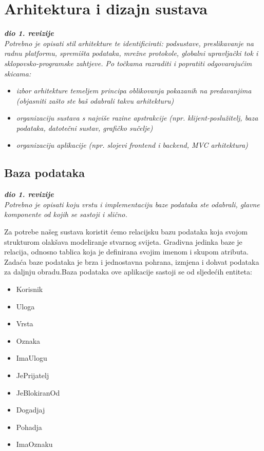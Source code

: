 \chapter{Arhitektura i dizajn sustava}
		
		\textbf{\textit{dio 1. revizije}}\\

		\textit{ Potrebno je opisati stil arhitekture te identificirati: podsustave, preslikavanje na radnu platformu, spremišta podataka, mrežne protokole, globalni upravljački tok i sklopovsko-programske zahtjeve. Po točkama razraditi i popratiti odgovarajućim skicama:}
	\begin{itemize}
		\item 	\textit{izbor arhitekture temeljem principa oblikovanja pokazanih na predavanjima (objasniti zašto ste baš odabrali takvu arhitekturu)}
		\item 	\textit{organizaciju sustava s najviše razine apstrakcije (npr. klijent-poslužitelj, baza podataka, datotečni sustav, grafičko sučelje)}
		\item 	\textit{organizaciju aplikacije (npr. slojevi frontend i backend, MVC arhitektura) }		
	\end{itemize}

	
		

		

				
		\section{Baza podataka}
			
			\textbf{\textit{dio 1. revizije}}\\
			
		\textit{Potrebno je opisati koju vrstu i implementaciju baze podataka ste odabrali, glavne komponente od kojih se sastoji i slično.}
		
		Za potrebe našeg sustava koristit ćemo relacijsku bazu podataka koja svojom strukturom olakšava modeliranje stvarnog svijeta. Gradivna jedinka baze je relacija, odnosno tablica koja je definirana svojim imenom i skupom atributa. Zadaća baze podataka je brza i jednostavna pohrana, izmjena i dohvat podataka za daljnju obradu.Baza podataka ove aplikacije sastoji se od sljedećih entiteta:
		
		\begin{itemize}
			\item Korisnik
			\item Uloga
			\item Vrsta
			\item Oznaka
			\item ImaUlogu
			\item JePrijatelj
			\item JeBlokiranOd
			\item Dogadjaj
			\item Pohadja
			\item ImaOznaku
			
		\end{itemize}
		
